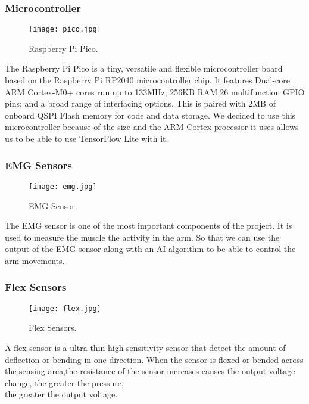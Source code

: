 \documentclass[12pt]{article}
\begin{document}
    \subsubsection{Microcontroller}
    \begin{flushleft}
        \begin{figure}[h!]
            \centering
            \texttt{[image: pico.jpg]}
            \caption{Raspberry Pi Pico.}
        \end{figure}
        The Raspberry Pi Pico is a tiny, versatile and flexible microcontroller board based on the Raspberry Pi RP2040 
        microcontroller chip. It features Dual-core ARM Cortex-M0+ cores run up to 133MHz; 256KB RAM;26 multifunction GPIO pins;
        and a broad range of interfacing options. This is paired with 2MB of onboard QSPI Flash memory for code and data storage.\cite{pico}
        \hspace*{2em} We decided to use this microcontroller because of the size and the ARM Cortex processor it uses allows us to be able to
        use TensorFlow Lite with it.
    \end{flushleft}
    \subsubsection{EMG Sensors}
    \begin{flushleft}
        \begin{figure}[h!]
            \centering
            \texttt{[image: emg.jpg]}
            \caption{EMG Sensor.}
        \end{figure}
        The EMG sensor is one of the most important components of the project.
        It is used to measure the muscle the activity in the arm. So that we can use the
        output of the EMG sensor along with an AI algorithm to be able to control the arm movements.
    \end{flushleft}
    \subsubsection{Flex Sensors}
    \begin{flushleft}
        \begin{figure}[h!]
            \centering
            \texttt{[image: flex.jpg]}
            \caption{Flex Sensors.}
        \end{figure}
        A flex sensor is a ultra-thin high-sensitivity sensor that detect the amount of deflection or bending in one direction. 
        When the sensor is flexed or bended across the sensing area,the resistance of the sensor increases causes the output voltage change, the greater the pressure,
        \\
        the greater the output voltage.
        \end{flushleft}
\end{document}
